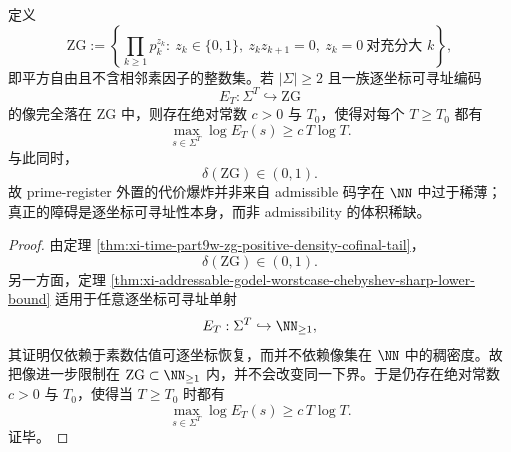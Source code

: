 \begin{corollary}\label{cor:xi-time-part9zh-zg-positive-density-does-not-weaken-address-cost}
定义
\[
\mathrm{ZG}
:=
\left\{
\prod_{k\ge 1}p_k^{z_k}:\ 
z_k\in\{0,1\},\ 
z_kz_{k+1}=0,\ 
z_k=0\ \text{对充分大 }k
\right\},
\]
即平方自由且不含相邻素因子的整数集。若 \(|\Sigma|\ge 2\) 且一族逐坐标可寻址编码
\[
E_T:\Sigma^T\hookrightarrow \mathrm{ZG}
\]
的像完全落在 \(\mathrm{ZG}\) 中，则存在绝对常数 \(c>0\) 与 \(T_0\)，使得对每个 \(T\ge T_0\) 都有
\[
\max_{s\in\Sigma^T}\log E_T(s)\ge c\,T\log T.
\]
与此同时，
\[
\delta(\mathrm{ZG})\in(0,1).
\]
故 prime-register 外置的代价爆炸并非来自 admissible 码字在 \(\NN\) 中过于稀薄；真正的障碍是逐坐标可寻址性本身，而非 admissibility 的体积稀缺。
\end{corollary}
\begin{proof}
由定理 \ref{thm:xi-time-part9w-zg-positive-density-cofinal-tail}，
\[
\delta(\mathrm{ZG})\in(0,1).
\]
另一方面，定理
\ref{thm:xi-addressable-godel-worstcase-chebyshev-sharp-lower-bound}
适用于任意逐坐标可寻址单射
\[
E_T:\Sigma^T\hookrightarrow \NN_{\ge 1},
\]
其证明仅依赖于素数估值可逐坐标恢复，而并不依赖像集在 \(\NN\) 中的稠密度。故把像进一步限制在 \(\mathrm{ZG}\subset\NN_{\ge 1}\) 内，并不会改变同一下界。于是仍存在绝对常数 \(c>0\) 与 \(T_0\)，使得当 \(T\ge T_0\) 时都有
\[
\max_{s\in\Sigma^T}\log E_T(s)\ge c\,T\log T.
\]
证毕。
\end{proof}

